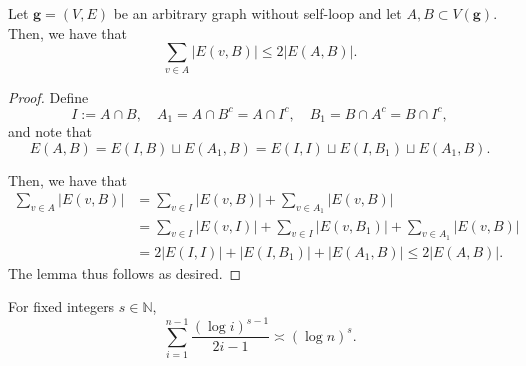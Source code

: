 \documentclass[twoside,11pt]{article}
\theoremstyle{remark}
\begin{document}
\begin{lemma}
\label{lem:edge_count_inequality}
Let $\bm{g} = (V, E)$ be an arbitrary graph without self-loop and let $A, B \subset V(\bm{g})$. Then, we have that
\[
\sum_{v \in A} |E(v, B)| \leq 2 |E(A, B)|.
\]
\end{lemma}
\begin{proof}
Define 
\[
I := A \cap B, \quad A_1 = A \cap B^c = A \cap I^c, \quad B_1 = B \cap A^c = B \cap I^c,
\]
and note that 
\[
E(A, B) = E(I, B) \sqcup E(A_1, B) = E(I, I) \sqcup E(I, B_1) \sqcup E(A_1, B).
\]

Then, we have that
\begin{align*}
\sum_{v \in A} |E(v, B)| &= \sum_{v \in I} |E(v, B)| + \sum_{v \in A_1} |E(v, B)| \\
&= \sum_{v \in I} |E(v, I)| + \sum_{v \in I} |E(v, B_1)| + \sum_{v \in A_1} |E(v, B)| \\
&= 2 |E(I, I)| + |E(I, B_1)| + |E(A_1, B)| \leq 2 |E(A, B)|.
\end{align*}
The lemma thus follows as desired.
\end{proof}

\begin{lemma}
\label{lemma integration}
For fixed integers $s \in \mathbb{N}$, 
%
\begin{equation*}
    \sum_{i=1}^{n-1} \frac{\left(\log i\right)^{s-1}}{2i-1} \asymp (\log n)^s.
\end{equation*}
%
\end{lemma}
\end{document}
